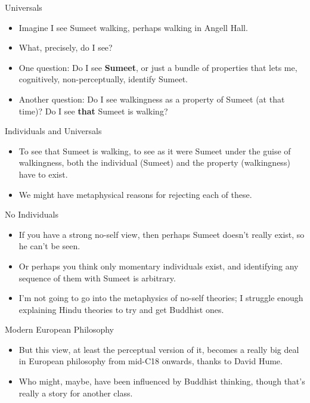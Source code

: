 \documentclass[
  17pt,
  letterpaper,
  ignorenonframetext,
  aspectratio=169,
  handout]{beamer}
\providecommand{\tightlist}{%
  \setlength{\itemsep}{0pt}\setlength{\parskip}{0pt}}\usepackage{longtable,booktabs,array}
\begin{document}
\begin{frame}{Universals}
\protect\hypertarget{universals}{}
\begin{itemize}[<+->]
\tightlist
\item
  Imagine I see Sumeet walking, perhaps walking in Angell Hall.
\item
  What, precisely, do I see?
\item
  One question: Do I see \textbf{Sumeet}, or just a bundle of properties
  that lets me, cognitively, non-perceptually, identify Sumeet.
\item
  Another question: Do I see walkingness as a property of Sumeet (at
  that time)? Do I see \textbf{that} Sumeet is walking?
\end{itemize}
\end{frame}

\begin{frame}{Individuals and Universals}
\protect\hypertarget{individuals-and-universals}{}
\begin{itemize}[<+->]
\tightlist
\item
  To see that Sumeet is walking, to see as it were Sumeet under the
  guise of walkingness, both the individual (Sumeet) and the property
  (walkingness) have to exist.
\item
  We might have metaphysical reasons for rejecting each of these.
\end{itemize}
\end{frame}

\begin{frame}{No Individuals}
\protect\hypertarget{no-individuals}{}
\begin{itemize}[<+->]
\tightlist
\item
  If you have a strong no-self view, then perhaps Sumeet doesn't really
  exist, so he can't be seen.
\item
  Or perhaps you think only momentary individuals exist, and identifying
  any sequence of them with Sumeet is arbitrary.
\item
  I'm not going to go into the metaphysics of no-self theories; I
  struggle enough explaining Hindu theories to try and get Buddhist
  ones.
\end{itemize}
\end{frame}

\begin{frame}{Modern European Philosophy}
\protect\hypertarget{modern-european-philosophy}{}
\begin{itemize}[<+->]
\tightlist
\item
  But this view, at least the perceptual version of it, becomes a really
  big deal in European philosophy from mid-C18 onwards, thanks to David
  Hume.
\item
  Who might, maybe, have been influenced by Buddhist thinking, though
  that's really a story for another class.
\end{itemize}
\end{frame}
\end{document}
